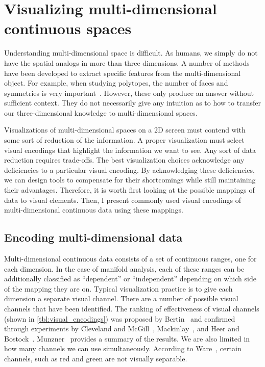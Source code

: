 
\section{Visualizing multi-dimensional continuous spaces}
\label{sec:multi-d-challenges}

Understanding multi-dimensional space is difficult. As humans, we simply do not
have the spatial analogs in more than three dimensions. A number of methods
have been developed to extract specific features from the multi-dimensional
object. For example, when studying polytopes, the number of faces and
symmetries is very important~\cite{Ziegler:2012}. However, these only produce
an answer without sufficient context. They do not necessarily give any
intuition as to how to transfer our three-dimensional knowledge to
multi-dimensional spaces.

Visualizations of multi-dimensional spaces on a 2D screen must contend with
some sort of reduction of the information. A proper visualization must select
visual encodings that highlight the information we want to see. Any sort of
data reduction requires trade-offs. The best visualization choices acknowledge
any deficiencies to a particular visual encoding. By acknowledging these
deficiencies, we can design tools to compensate for their shortcomings while
still maintaining their advantages. Therefore, it is worth first looking at the
possible mappings of data to visual elements. Then, I present commonly used
visual encodings of multi-dimensional continuous data using these mappings.

\subsection{Encoding multi-dimensional data}

Multi-dimensional continuous data consists of a set of continuous ranges, one
for each dimension. In the case of manifold analysis, each of these ranges can
be additionally classified as ``dependent'' or ``independent'' depending on
which side of the mapping they are on. Typical visualization practice is to
give each dimension a separate visual channel. There are a number of possible
visual channels that have been identified.  The ranking of effectiveness of
visual channels (shown in \autoref{tbl:visual_encodings}) was proposed by
Bertin~\cite{Bertin:1967} and confirmed through experiments by Cleveland and
McGill~\cite{Cleveland:1984}, Mackinlay~\cite{Mackinlay:1986}, and Heer and
Bostock~\cite{Heer:2010}.  Munzner~\cite{Munzner:2014} provides a summary of
the results. We are also limited in how many channels we can use
simultaneously. According to Ware~\cite{Ware:2004}, certain channels, such as
red and green are not visually separable. 


